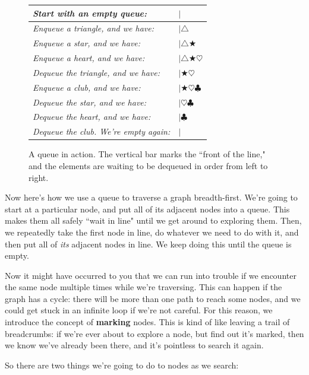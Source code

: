\afterpage{\clearpage}

\begin{figure}[ht]
\centering
\begin{tabular}{l l}
\textit{Start with an empty queue:} & $|$ \\
\hline
\textit{Enqueue a triangle, and we have:} & $|\triangle$ \\
\hline
\textit{Enqueue a star, and we have:} & $|\triangle \bigstar$ \\
\hline
\textit{Enqueue a heart, and we have:} & $|\triangle \bigstar \heartsuit$ \\
\hline
\textit{Dequeue the triangle, and we have:} & $|\bigstar \heartsuit$ \\
\hline
\textit{Enqueue a club, and we have:} & $|\bigstar \heartsuit \clubsuit$ \\
\hline
\textit{Dequeue the star, and we have:} & $|\heartsuit \clubsuit$ \\
\hline
\textit{Dequeue the heart, and we have:} & $|\clubsuit$ \\
\hline
\textit{Dequeue the club. We're empty again:} & $|$ \\
\end{tabular}
\caption{A queue in action. The vertical bar marks the ``front of the
line," and the elements are waiting to be dequeued in order from left to
right.}
\label{queue}
\end{figure}

Now here's how we use a queue to traverse a graph breadth-first. We're
going to start at a particular node, and put all of its adjacent nodes into
a queue. This makes them all safely ``wait in line" until we get around to
exploring them. Then, we repeatedly take the first node in line, do
whatever we need to do with it, and then put all of \textit{its} adjacent
nodes in line. We keep doing this until the queue is empty.

Now it might have occurred to you that we can run into trouble if we
encounter the same node multiple times while we're traversing. This can
happen if the graph has a cycle: there will be more than one path to reach
some nodes, and we could get stuck in an infinite loop if we're not
careful. For this reason, we introduce the concept of \textbf{marking} 
nodes. This is kind of like leaving a trail of breadcrumbs: if we're ever
about to explore a node, but find out it's marked, then we know we've
already been there, and it's pointless to search it again.

So there are two things we're going to do to nodes as we search:

